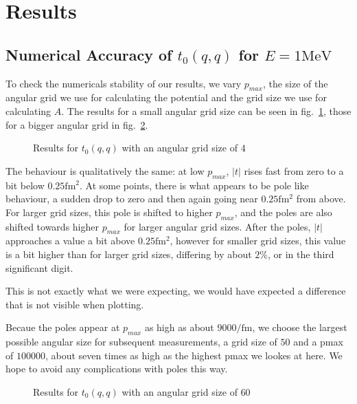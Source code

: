 \documentclass{scrartcl}
\begin{document}

\section{Results}
\subsection{Numerical Accuracy of $t_0(q,q)$ for $E=1\si{\mega\electronvolt}$}

To check the numericals stability of our results, we vary $p_{max}$, the size of the angular grid we use for calculating the potential and the grid size we use for calculating $A$. The results for a small angular grid size can be seen in fig.~\ref{fig:tnnsmallangsize}, those for a bigger angular grid in fig.~\ref{fig:tnnbigangsize}.


\begin{figure}[htbp]
	
	\caption{Results for $t_0(q,q)$ with an angular grid size of $4$}
	\label{fig:tnnsmallangsize}
\end{figure}


The behaviour is qualitatively the same: at low $p_{max}$, $|t|$ rises fast from zero to a bit below $0.25\si{\femto\meter^2}$. At some points, there is what appears to be pole like behaviour, a sudden drop to zero and then again going near $0.25\si{\femto\meter^2}$ from above. For larger grid sizes, this pole is shifted to higher $p_{max}$, and the poles are also shifted towards higher $p_{max}$ for larger angular grid sizes. After the poles, $|t|$ approaches a value a bit above $0.25\si{\femto\meter^2}$, however for smaller grid sizes, this value is a  bit higher than for larger grid sizes, differing by about $2\%$, or in the third significant digit.

This is not exactly what we were expecting, we would have expected a difference that is not visible when plotting. 

Becaue the poles appear at $p_{max}$ as high as about $9000\si{\per\femto\meter}$, we choose the largest possible angular size for subsequent measurements, a grid size of $50$ and a pmax of $100000$, about seven times as high as the highest pmax we lookes at here. We hope to avoid any complications with poles this way.

\begin{figure}[htbp]
	
	\caption{Results for $t_0(q,q)$ with an angular grid size of $60$}
	\label{fig:tnnbigangsize}
\end{figure}
\end{document}
